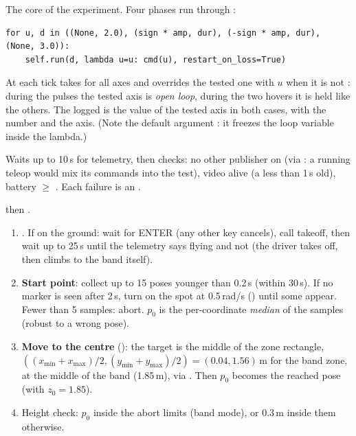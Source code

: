 The core of the experiment. Four phases run through :
\begin{lstlisting}
for u, d in ((None, 2.0), (sign * amp, dur), (-sign * amp, dur), (None, 3.0)):
    self.run(d, lambda u=u: cmd(u), restart_on_loss=True)
\end{lstlisting}
At each tick  takes  for all axes and overrides the tested one with $u$ when it is
not : during the pulses the tested axis is \emph{open loop}, during the two hovers it is held like the
others. The logged  is the value of the tested axis in both cases, with the  number and the
axis. (Note the default argument : it freezes the loop variable inside the lambda.)

Waits up to 10\,s for telemetry, then checks: no other publisher on  (via
: a running teleop would mix its commands into the test), video alive
(a  less than 1\,s old), battery $\ge$ . Each failure is an .

 then .

\begin{enumerate}[nosep]
\item {}. If on the ground: wait for ENTER (any other key cancels), call takeoff, then wait up
to 25\,s until the telemetry says flying and not  (the driver takes off, then climbs to the band
itself).
\item \textbf{Start point}: collect up to 15 poses younger than 0.2\,s (within 30\,s). If no marker is seen after
2\,s, turn on the spot at 0.5\,rad/s () until some appear. Fewer than 5 samples: abort. $p_0$ is the
per-coordinate \emph{median} of the samples (robust to a wrong pose).
\item \textbf{Move to the centre} (): the target is the middle of the zone rectangle,
$((x_{\min}+x_{\max})/2, (y_{\min}+y_{\max})/2) = (0.04, 1.56)$\,m for the band zone, at the middle of the band
(1.85\,m), via . Then $p_0$ becomes the reached pose (with $z_0 = 1.85$).
\item Height check: $p_0$ inside the abort limits (band mode), or 0.3\,m inside them otherwise.
\end{enumerate}

